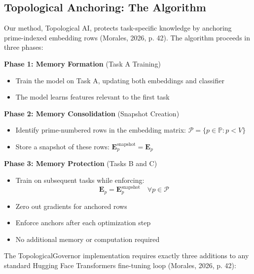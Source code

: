 \documentclass{article}
\begin{document}
\subsection{Topological Anchoring: The Algorithm}

Our method, Topological AI, protects task-specific knowledge by anchoring prime-indexed embedding rows (Morales, 2026, p. 42). The algorithm proceeds in three phases:

\textbf{Phase 1: Memory Formation} (Task A Training)
\begin{itemize}
\item Train the model on Task A, updating both embeddings and classifier
\item The model learns features relevant to the first task
\end{itemize}

\textbf{Phase 2: Memory Consolidation} (Snapshot Creation)
\begin{itemize}
\item Identify prime-numbered rows in the embedding matrix: $\mathcal{P} = \{p \in \mathbb{P} : p < V\}$
\item Store a snapshot of these rows: $\mathbf{E}_p^{\text{snapshot}} = \mathbf{E}_p$
\end{itemize}

\textbf{Phase 3: Memory Protection} (Tasks B and C)
\begin{itemize}
\item Train on subsequent tasks while enforcing:
\begin{equation}
\mathbf{E}_p = \mathbf{E}_p^{\text{snapshot}} \quad \forall p \in \mathcal{P}
\end{equation}
\item Zero out gradients for anchored rows
\item Enforce anchors after each optimization step
\item No additional memory or computation required
\end{itemize}

The TopologicalGovernor implementation requires exactly three additions to any standard Hugging Face Transformers fine-tuning loop (Morales, 2026, p. 42):
\end{document}
